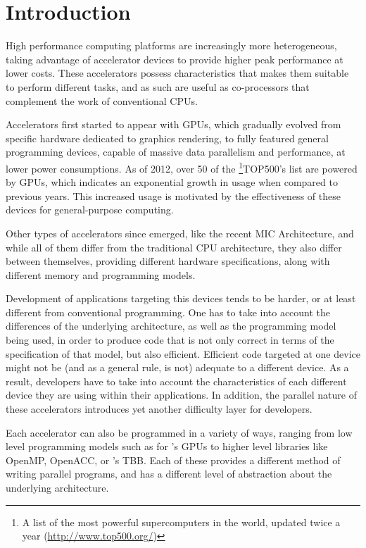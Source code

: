 \documentclass[main.tex]{subfiles}
\begin{document}
\chapter{Introduction}

High performance computing platforms are increasingly more heterogeneous, taking advantage of accelerator devices to provide higher peak performance at lower costs. These accelerators possess characteristics that makes them suitable to perform different tasks, and as such are useful as co-processors that complement the work of conventional \acp{CPU}.

Accelerators first started to appear with \acp{GPU}, which gradually evolved from specific hardware dedicated to graphics rendering, to fully featured general programming devices, capable of massive data parallelism and performance, at lower power consumptions. As of 2012, over 50 of the \footnote{A list of the most powerful supercomputers in the world, updated twice a year (\url{http://www.top500.org/})}{TOP500's} list are powered by \acp{GPU}, which indicates an exponential growth in usage when compared to previous years. This increased usage is motivated by the effectiveness of these devices for general-purpose computing. 

Other types of accelerators since emerged, like the recent \intel \ac{MIC} Architecture, and while all of them differ from the traditional \ac{CPU} architecture, they also differ between themselves, providing different hardware specifications, along with different memory and programming models. 

Development of applications targeting this devices tends to be harder, or at least different from conventional programming. One has to take into account the differences of the underlying architecture, as well as the programming model being used, in order to produce code that is not only correct in terms of the specification of that model, but also efficient. Efficient code targeted at one device might not be (and as a general rule, is not) adequate to a different device. As a result, developers have to take into account the characteristics of each different device they are using within their applications. In addition, the parallel nature of these accelerators introduces yet another difficulty layer for developers.

Each accelerator can also be programmed in a variety of ways, ranging from low level programming models such as \cuda for \nvidia's \acp{GPU} to higher level libraries like \acs{OpenMP}, \acs{OpenACC}, or \intel's \acs{TBB}. Each of these provides a different method of writing parallel programs, and has a different level of abstraction about the underlying architecture. 
\end{document}
